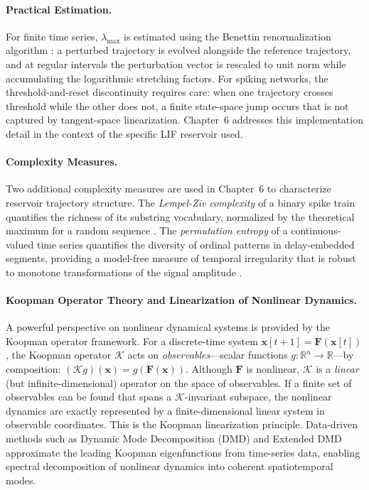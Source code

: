 \paragraph{Practical Estimation.}
For finite time series, $\lambda_{\max}$ is estimated using the Benettin renormalization algorithm \cite{benettin_lyapunov_1980}: a perturbed trajectory is evolved alongside the reference trajectory, and at regular intervals the perturbation vector is rescaled to unit norm while accumulating the logarithmic stretching factors. For spiking networks, the threshold-and-reset discontinuity requires care: when one trajectory crosses threshold while the other does not, a finite state-space jump occurs that is not captured by tangent-space linearization. Chapter~6 addresses this implementation detail in the context of the specific LIF reservoir used.

\paragraph{Complexity Measures.}
Two additional complexity measures are used in Chapter~6 to characterize reservoir trajectory structure. The \emph{Lempel-Ziv complexity} of a binary spike train quantifies the richness of its substring vocabulary, normalized by the theoretical maximum for a random sequence \cite{bandt_permutation_2002}. The \emph{permutation entropy} of a continuous-valued time series quantifies the diversity of ordinal patterns in delay-embedded segments, providing a model-free measure of temporal irregularity that is robust to monotone transformations of the signal amplitude \cite{bandt_permutation_2002}.

\paragraph{Koopman Operator Theory and Linearization of Nonlinear Dynamics.}
A powerful perspective on nonlinear dynamical systems is provided by the Koopman operator framework. For a discrete-time system $\mathbf{x}[t+1] = \mathbf{F}(\mathbf{x}[t])$, the Koopman operator $\mathcal{K}$ acts on \emph{observables}---scalar functions $g: \mathbb{R}^n \to \mathbb{R}$---by composition: $(\mathcal{K} g)(\mathbf{x}) = g(\mathbf{F}(\mathbf{x}))$. Although $\mathbf{F}$ is nonlinear, $\mathcal{K}$ is a \emph{linear} (but infinite-dimensional) operator on the space of observables. If a finite set of observables can be found that spans a $\mathcal{K}$-invariant subspace, the nonlinear dynamics are exactly represented by a finite-dimensional linear system in observable coordinates. This is the Koopman linearization principle. Data-driven methods such as Dynamic Mode Decomposition (DMD) and Extended DMD approximate the leading Koopman eigenfunctions from time-series data, enabling spectral decomposition of nonlinear dynamics into coherent spatiotemporal modes.

